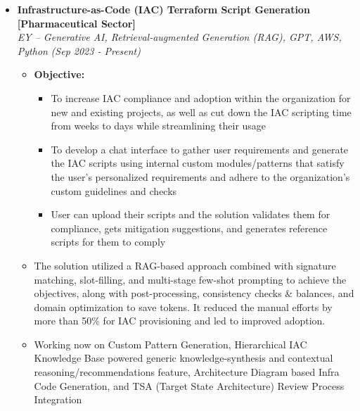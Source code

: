 \documentclass[a4paper,10pt]{article}
\newcommand{\isep}{-2 pt}
\begin{document}
\begin{itemize}
\item \textbf{Infrastructure-as-Code (IAC) Terraform Script Generation [Pharmaceutical Sector]}  \\
    \emph{EY -- Generative AI, Retrieval-augmented Generation (RAG), GPT, AWS, Python} \hfill {\emph{(Sep 2023 - Present)}}
    \\[-0.5cm]
    \begin{itemize}\itemsep \isep
    \item \textbf{Objective:} 
        \begin{itemize}\itemsep \isep
        \item To increase IAC compliance and adoption within the organization for new and existing projects, as well as cut down the IAC scripting time from weeks to days while streamlining their usage
        \item To develop a chat interface to gather user requirements and generate the IAC scripts using internal custom modules/patterns that satisfy the user's personalized requirements and adhere to the organization's custom guidelines and checks
        \item User can upload their scripts and the solution validates them for compliance, gets mitigation suggestions, and generates reference scripts for them to comply
        \end{itemize}
    \item The solution utilized a RAG-based approach combined with signature matching, slot-filling, and multi-stage few-shot prompting to achieve the objectives, along with post-processing, consistency checks \& balances, and domain optimization to save tokens. It reduced the manual efforts by more than 50\% for IAC provisioning and led to improved adoption.
    \item Working now on Custom Pattern Generation, Hierarchical IAC Knowledge Base powered generic knowledge-synthesis and contextual reasoning/recommendations feature, Architecture Diagram based Infra Code Generation, and TSA (Target State Architecture) Review Process Integration
    \\ [-0.5cm]
    \end{itemize}


\end{itemize}
\end{document}
